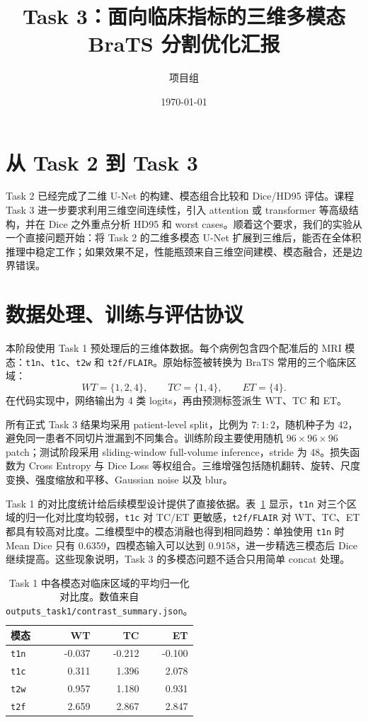 \documentclass[UTF8,11pt]{ctexart}
\title{Task 3：面向临床指标的三维多模态 BraTS 分割优化汇报}
\author{项目组}
\date{\today}
\begin{document}
\maketitle

\section{从 Task 2 到 Task 3}

Task 2 已经完成了二维 U-Net 的构建、模态组合比较和 Dice/HD95 评估。课程 Task 3 进一步要求利用三维空间连续性，引入 attention 或 transformer 等高级结构，并在 Dice 之外重点分析 HD95 和 worst cases。顺着这个要求，我们的实验从一个直接问题开始：将 Task 2 的二维多模态 U-Net 扩展到三维后，能否在全体积推理中稳定工作；如果效果不足，性能瓶颈来自三维空间建模、模态融合，还是边界错误。

\section{数据处理、训练与评估协议}

本阶段使用 Task 1 预处理后的三维体数据。每个病例包含四个配准后的 MRI 模态：\texttt{t1n}、\texttt{t1c}、\texttt{t2w} 和 \texttt{t2f/FLAIR}。原始标签被转换为 BraTS 常用的三个临床区域：
\[
WT=\{1,2,4\}, \qquad TC=\{1,4\}, \qquad ET=\{4\}.
\]
在代码实现中，网络输出为 4 类 logits，再由预测标签派生 WT、TC 和 ET。

所有正式 Task 3 结果均采用 patient-level split，比例为 $7:1:2$，随机种子为 42，避免同一患者不同切片泄漏到不同集合。训练阶段主要使用随机 $96\times96\times96$ patch；测试阶段采用 sliding-window full-volume inference，stride 为 48。损失函数为 Cross Entropy 与 Dice Loss 等权组合。三维增强包括随机翻转、旋转、尺度变换、强度缩放和平移、Gaussian noise 以及 blur。

Task 1 的对比度统计给后续模型设计提供了直接依据。表~\ref{tab:contrast} 显示，\texttt{t1n} 对三个区域的归一化对比度均较弱，\texttt{t1c} 对 TC/ET 更敏感，\texttt{t2f/FLAIR} 对 WT、TC、ET 都具有较高对比度。二维模型中的模态消融也得到相同趋势：单独使用 \texttt{t1n} 时 Mean Dice 只有 0.6359，四模态输入可以达到 0.9158，进一步精选三模态后 Dice 继续提高。这些现象说明，Task 3 的多模态问题不适合只用简单 concat 处理。

\begin{table}[H]
\centering
\caption{Task 1 中各模态对临床区域的平均归一化对比度。数值来自 \texttt{outputs\_task1/contrast\_summary.json}。}
\label{tab:contrast}
\begin{tabular}{lrrr}
\toprule
模态 & WT & TC & ET \\
\midrule
\texttt{t1n} & -0.037 & -0.212 & -0.100 \\
\texttt{t1c} & 0.311 & 1.396 & 2.078 \\
\texttt{t2w} & 0.957 & 1.180 & 0.931 \\
\texttt{t2f} & 2.659 & 2.867 & 2.847 \\
\bottomrule
\end{tabular}
\end{table}
\end{document}
